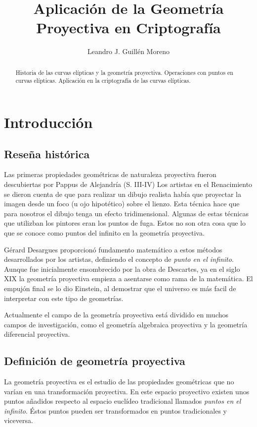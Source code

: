 \documentclass[a4,12pt]{article}
\title{Aplicación de la Geometría Proyectiva en Criptografía}
\author{Leandro J. Guillén Moreno}
\date{}
\begin{document}
\maketitle

\begin{abstract}
Historia de las curvas elípticas y la geometría proyectiva. Operaciones con puntos en curvas elípticas. Aplicación en la criptografía de las curvas elípticas.
\end{abstract}
\newpage %
\tableofcontents
\newpage
\section{Introducción}
\subsection{Reseña histórica}
Las primeras propiedades geométricas de naturaleza proyectiva fueron descubiertas por Pappus de Alejandría (S. III-IV)
Los artistas en el Renacimiento se dieron cuenta de que para realizar un dibujo realista había que proyectar la imagen desde un foco (u ojo hipotético) sobre el lienzo. Esta técnica hace que para nosotros el dibujo tenga un efecto tridimensional. Algunas de estas técnicas que utilizban los pintores eran los puntos de fuga. Estos no son otra cosa que lo que se conoce como puntos del infinito en la geometría proyectiva.

Gérard Desargues proporcionó fundamento matemático\cite{desargues} a estos métodos desarrollados por los artistas, definiendo el concepto de \emph{punto en el infinito}. Aunque fue inicialmente ensombrecido por la obra de Descartes, ya en el siglo XIX la geometría proyectiva empieza a asentarse como rama de la matemática. El empujón final se lo dio Einstein, al demostrar que el universo es más facil de interpretar con este tipo de geometrías.

Actualmente el campo de la geometría proyectiva está dividido en muchos campos de investigación, como el geometría algebraica proyectiva y la geometría diferencial proyectiva.

\subsection{Definición de geometría proyectiva}
La geometría proyectiva es el estudio de las propiedades geométricas que no varían en una transformación proyectiva. En este espacio proyectivo existen unos puntos añadidos respecto al espacio euclídeo tradicional llamados \emph{puntos en el infinito}. Éstos puntos pueden ser transformados en puntos tradicionales y viceversa.
\end{document}
